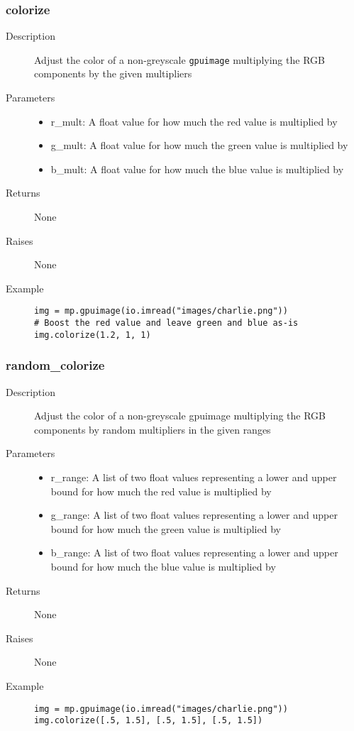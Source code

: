 \subsubsection{colorize}

\begin{description}
   \item[Description] Adjust the color of a non-greyscale \verb|gpuimage| multiplying the RGB components by the given multipliers
   \item[Parameters] \phantom{}
   \begin{itemize}
   \item r\_mult: A float value for how much the red value is multiplied by
   \item g\_mult: A float value for how much the green value is multiplied by
   \item b\_mult: A float value for how much the blue value is multiplied by
   \end{itemize}
   \item[Returns] None
   \item[Raises] None
   \item[Example] \phantom{}
   \begin{lstlisting}
img = mp.gpuimage(io.imread("images/charlie.png"))
# Boost the red value and leave green and blue as-is
img.colorize(1.2, 1, 1)
\end{lstlisting}
\end{description}

\subsubsection{random\_colorize}

\begin{description}
   \item[Description] Adjust the color of a non-greyscale gpuimage multiplying the RGB components by random multipliers in the given ranges
   \item[Parameters] \phantom{}
   \begin{itemize}
   \item r\_range: A list of two float values representing a lower and upper bound for how much the red value is multiplied by
   \item g\_range: A list of two float values representing a lower and upper bound for how much the green value is multiplied by
   \item b\_range: A list of two float values representing a lower and upper bound for how much the blue value is multiplied by
   \end{itemize}
   \item[Returns] None
   \item[Raises] None
   \item[Example] \phantom{}
   \begin{lstlisting}
img = mp.gpuimage(io.imread("images/charlie.png"))
img.colorize([.5, 1.5], [.5, 1.5], [.5, 1.5])
\end{lstlisting}
\end{description}

